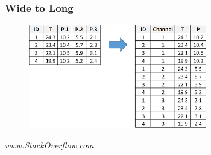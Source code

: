 \documentclass{beamer}
\begin{document}
\begin{frame}
\frametitle{Wide to Long}
\begin{figure}
\centering
\includegraphics[width=0.9\linewidth]{images/widetolong}
\end{figure}
\textit{www.StackOverflow.com}
\end{frame}
\end{document}
